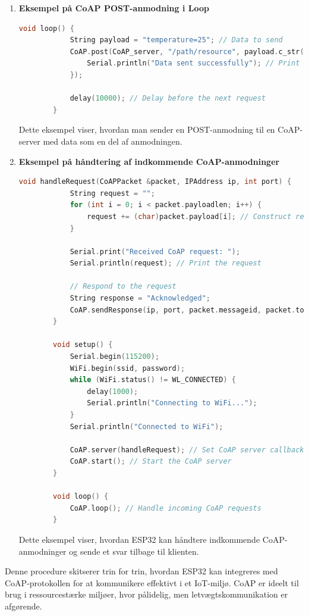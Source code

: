 \begin{enumerate}
\begin{lstlisting}[language=C++, caption=Syntaks]
			delay(10000); // Delay before the next request
		}
	\end{lstlisting}
	\noindent Dette eksempel viser, hvordan man sender en GET-anmodning til en CoAP-server og modtager et svar.
	
	\item \textbf{Eksempel på CoAP POST-anmodning i Loop}
	\begin{lstlisting}[language=C++, caption=Syntaks]
		void loop() {
			String payload = "temperature=25"; // Data to send
			CoAP.post(CoAP_server, "/path/resource", payload.c_str(), payload.length(), [](CoAPPacket &packet, IPAddress ip, int port) {
				Serial.println("Data sent successfully"); // Print success message
			});
			
			delay(10000); // Delay before the next request
		}
	\end{lstlisting}
	\noindent Dette eksempel viser, hvordan man sender en POST-anmodning til en CoAP-server med data som en del af anmodningen.
	
	\item \textbf{Eksempel på håndtering af indkommende CoAP-anmodninger}
	\begin{lstlisting}[language=C++, caption=Syntaks]
		void handleRequest(CoAPPacket &packet, IPAddress ip, int port) {
			String request = "";
			for (int i = 0; i < packet.payloadlen; i++) {
				request += (char)packet.payload[i]; // Construct request string
			}
			
			Serial.print("Received CoAP request: ");
			Serial.println(request); // Print the request
			
			// Respond to the request
			String response = "Acknowledged";
			CoAP.sendResponse(ip, port, packet.messageid, packet.token, response.c_str(), response.length(), packet.type);
		}
		
		void setup() {
			Serial.begin(115200);
			WiFi.begin(ssid, password);
			while (WiFi.status() != WL_CONNECTED) {
				delay(1000);
				Serial.println("Connecting to WiFi...");
			}
			Serial.println("Connected to WiFi");
			
			CoAP.server(handleRequest); // Set CoAP server callback
			CoAP.start(); // Start the CoAP server
		}
		
		void loop() {
			CoAP.loop(); // Handle incoming CoAP requests
		}
	\end{lstlisting}
	\noindent Dette eksempel viser, hvordan ESP32 kan håndtere indkommende CoAP-anmodninger og sende et svar tilbage til klienten.
\end{enumerate}
\noindent Denne procedure skitserer trin for trin, hvordan ESP32 kan integreres med CoAP-protokollen for at kommunikere effektivt i et IoT-miljø. CoAP er ideelt til brug i ressourcestærke miljøer, hvor pålidelig, men letvægtskommunikation er afgørende.

